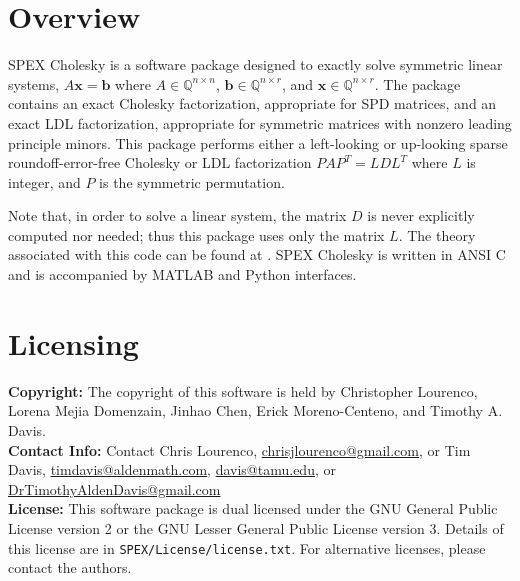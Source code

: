 \documentclass[12pt,oneside]{book}
\theoremstyle{definition}
\renewcommand{\b}{\mathbf{b}}
\newcommand{\x}{\mathbf{x}}
\begin{document}
\section{Overview} \label{s:Chol:intro}
SPEX Cholesky is a software package designed to exactly solve symmetric linear systems, $A \x = \b$ where $A \in \mathbb{Q}^{n \times
n}$, $\b \in \mathbb{Q}^{n \times r}$, and $\x \in \mathbb{Q}^{n \times
r}$. 
The package contains an exact Cholesky factorization, appropriate for SPD matrices,
and an exact LDL factorization, appropriate for symmetric matrices with nonzero
leading principle minors.
This package performs either a left-looking or up-looking sparse roundoff-error-free Cholesky or LDL factorization $P A P^T =  L D L^T$ where $L$ is integer,
and $P$ is the symmetric permutation.

Note that, in order to solve a linear system, the matrix $D$ is never explicitly computed nor needed; thus this package uses only the matrix $L$. The theory associated with this code can be found at
 \cite{lourenco2022exactly}. SPEX Cholesky is written in ANSI C and is accompanied by MATLAB and Python interfaces.

 
\section{Licensing} \label{s:Chol:licensing}
\textbf{Copyright:} The copyright of this software is held by  Christopher Lourenco, Lorena Mejia Domenzain, Jinhao Chen, Erick Moreno-Centeno, and Timothy A. Davis.\\

\noindent \textbf{Contact Info:} Contact Chris Lourenco,
\href{mailto:chrisjlourenco@gmail.com}{chrisjlourenco@gmail.com}, or Tim Davis,
\href{mailto:timdavis@aldenmath.com}{timdavis@aldenmath.com},
\href{mailto:davis@tamu.edu}{davis@tamu.edu}, or
\href{DrTimothyAldenDavis@gmail.com}{DrTimothyAldenDavis@gmail.com}\\

\noindent \textbf{License:} This software package is dual licensed under the GNU General Public License version 2 or the GNU Lesser General Public License version 3. Details of this license are in \verb|SPEX/License/license.txt|. For alternative licenses, please contact the authors.
\end{document}
